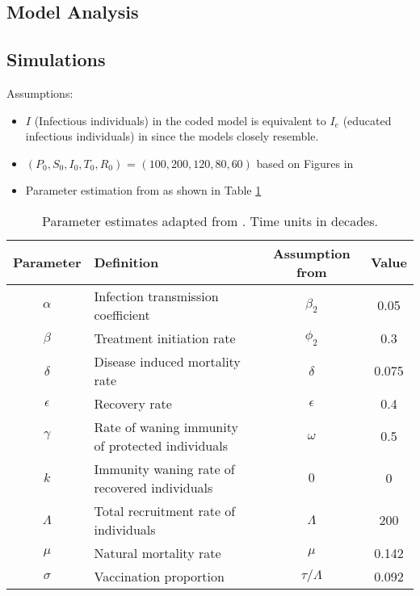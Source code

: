 \documentclass{book}\usepackage[]{graphicx}\usepackage[]{color}
\begin{document}
\subsection*{Model Analysis}
\subsection*{Simulations}
Assumptions:
\begin{itemize}
    \item $I$ (Infectious individuals) in the coded model is equivalent to $I_e$ (educated infectious individuals) in \cite{akinduko2018series} since the models closely resemble.
    \item $(P_0, S_0, I_0, T_0, R_0)$ = $(100, 200, 120, 80,60)$ based on Figures in \cite{akinduko2018series}
    \item Parameter estimation from \cite{akinduko2018series} as shown in Table \ref{tab:typhoid_params}
\end{itemize}

\begin{table}[]
    \centering
    \begin{tabular}{c l c c}\hline
        Parameter & Definition & Assumption from \cite{akinduko2018series} & Value  \\ \hline
         $\alpha$ & Infection transmission coefficient & $\beta_2$ & 0.05\\
         $\beta$ & Treatment initiation rate & $\phi_2$ & 0.3\\
         $\delta$ & Disease induced mortality rate & $\delta$ & 0.075\\
         $\epsilon$ & Recovery rate & $\epsilon$ & 0.4\\
         $\gamma$ & Rate of waning immunity of protected individuals & $\omega$ & 0.5\\
         $k$ & Immunity waning rate of recovered individuals & $0$ & 0\\
         $\Lambda$ &Total recruitment rate of individuals & $\Lambda$ & 200\\
         $\mu$ & Natural mortality rate & $\mu$ & 0.142\\
         $\sigma$ & Vaccination proportion & $\tau/\Lambda$ &0.092\\ \hline
    \end{tabular}
    \caption{Parameter estimates adapted from \cite{akinduko2018series}. Time units in decades. }
    \label{tab:typhoid_params}
\end{table}
\end{document}
